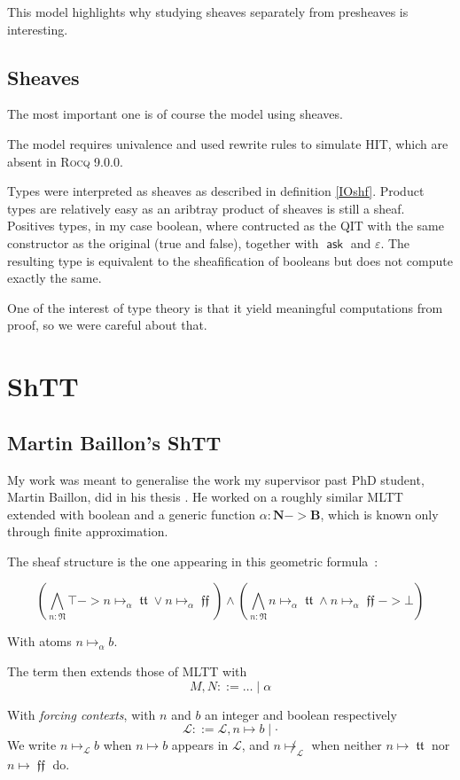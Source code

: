 \documentclass[11pt]{article}
\DeclareMathOperator{\ask}{\mathsf{ask}}
\DeclareMathOperator{\mtrue}{\mathfrak{tt}}
\DeclareMathOperator{\mfalse}{\mathfrak{ff}}
\newcommand{\0}{\mathbf{0}}
\newcommand{\1}{\mathbf{1}}
\newcommand{\nat}{\mathbf{N}}
\newcommand{\mnat}{\mathfrak{N}}
\newcommand{\bool}{\mathbf{B}}
\newcommand{\fctx}{\mathcal{L}}
\begin{document}
This model highlights why studying sheaves separately from presheaves is interesting.

\subsection{Sheaves}

The most important one is of course the model using sheaves.

The model requires univalence and used rewrite rules to simulate HIT, which are absent in \textsc{Rocq} 9.0.0.

Types were interpreted as sheaves as described in definition \ref{IOshf}. Product types are relatively easy as an aribtray product of sheaves is still a sheaf. Positives types, in my case boolean, where contructed as the QIT with the same constructor as the original (true and false), together with $\ask$ and $\varepsilon$. The resulting type is equivalent to the sheafification of booleans but does not compute exactly the same.

One of the interest of type theory is that it yield meaningful computations from proof, so we were careful about that.

\section{ShTT}\label{ShTT}
\subsection{Martin Baillon's ShTT}\label{MBshtt}
My work was meant to generalise the work my supervisor past PhD student, Martin Baillon, did in his thesis \cite{baillon:tel-04617881}. He worked on a roughly similar MLTT extended with boolean and a generic function $\alpha: \nat -> \bool$, which is known only through finite approximation.

The sheaf structure is the one appearing in this geometric formula~:

$$ \left(\bigwedge_{n : \mnat} \top -> n \mapsto_\alpha \mtrue \vee n \mapsto_\alpha \mfalse\right) \wedge \left(\bigwedge_{n : \mnat} n\mapsto_\alpha \mtrue \wedge  n \mapsto_\alpha \mfalse -> \bot \right)$$

With atoms $n \mapsto_\alpha b$.


The term then extends those of MLTT with
$$ M, N ::= \dots \mid \alpha$$

With \emph{forcing contexts}, with $n$ and $b$ an integer and boolean respectively
$$ \fctx ::= \fctx, n \mapsto b \mid \cdot$$
We write $n\mapsto_\fctx b$ when $n\mapsto b$ appears in $\fctx$, and $n\not\mapsto_\fctx$ when neither $n\mapsto \mtrue$ nor $n\mapsto \mfalse$ do.
\end{document}
